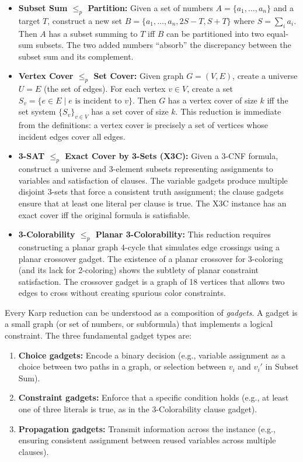 \begin{itemize}
\item \textbf{Subset Sum $\le_p$ Partition:} Given a set of numbers $A = \{a_1, \dots, a_n\}$ and a target $T$, construct a new set $B = \{a_1, \dots, a_n, 2S-T, S+T\}$ where $S = \sum_i a_i$. Then $A$ has a subset summing to $T$ iff $B$ can be partitioned into two equal-sum subsets. The two added numbers ``absorb'' the discrepancy between the subset sum and its complement.

\item \textbf{Vertex Cover $\le_p$ Set Cover:} Given graph $G = (V,E)$, create a universe $U = E$ (the set of edges). For each vertex $v \in V$, create a set $S_v = \{ e \in E \mid e \text{ is incident to } v \}$. Then $G$ has a vertex cover of size $k$ iff the set system $\{S_v\}_{v \in V}$ has a set cover of size $k$. This reduction is immediate from the definitions: a vertex cover is precisely a set of vertices whose incident edges cover all edges.

\item \textbf{3-SAT $\le_p$ Exact Cover by 3-Sets (X3C):} Given a 3-CNF formula, construct a universe and 3-element subsets representing assignments to variables and satisfaction of clauses. The variable gadgets produce multiple disjoint 3-sets that force a consistent truth assignment; the clause gadgets ensure that at least one literal per clause is true. The X3C instance has an exact cover iff the original formula is satisfiable.

\item \textbf{3-Colorability $\le_p$ Planar 3-Colorability:} This reduction requires constructing a planar graph 4-cycle that simulates edge crossings using a planar crossover gadget. The existence of a planar crossover for 3-coloring (and its lack for 2-coloring) shows the subtlety of planar constraint satisfaction. The crossover gadget is a graph of 18 vertices that allows two edges to cross without creating spurious color constraints.
\end{itemize}

Every Karp reduction can be understood as a composition of \emph{gadgets}. A gadget is a small graph (or set of numbers, or subformula) that implements a logical constraint. The three fundamental gadget types are:

\begin{enumerate}
\item \textbf{Choice gadgets:} Encode a binary decision (e.g., variable assignment as a choice between two paths in a graph, or selection between $v_i$ and $v_i'$ in Subset Sum).
\item \textbf{Constraint gadgets:} Enforce that a specific condition holds (e.g., at least one of three literals is true, as in the 3-Colorability clause gadget).
\item \textbf{Propagation gadgets:} Transmit information across the instance (e.g., ensuring consistent assignment between reused variables across multiple clauses).
\end{enumerate}

